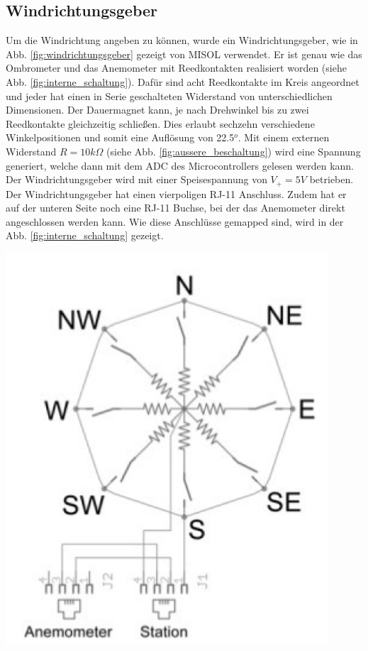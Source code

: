 \subsection{Windrichtungsgeber}
{\begin{minipage}[b][10cm][t]{0.55\textwidth}
Um die Windrichtung angeben zu können, wurde ein Windrichtungsgeber, wie in Abb. \ref{fig:windrichtungsgeber} gezeigt von MISOL verwendet. Er ist genau wie das Ombrometer und das Anemometer mit Reedkontakten realisiert worden (siehe Abb. \ref{fig:interne_schaltung}). Dafür sind acht Reedkontakte im Kreis angeordnet und jeder hat einen in Serie geschalteten Widerstand von unterschiedlichen Dimensionen. Der Dauermagnet kann, je nach Drehwinkel bis zu zwei Reedkontakte gleichzeitig schließen. Dies erlaubt sechzehn verschiedene Winkelpositionen und somit eine Auflösung von 22.5$^{o}$. Mit einem externen Widerstand $R=10k\Omega$ (siehe Abb. \ref{fig:aussere_beschaltung}) wird eine Spannung generiert, welche dann mit dem ADC des Microcontrollers gelesen werden kann. Der Windrichtungsgeber wird mit einer Speisespannung von $V_{+}=5V$ betrieben. Der Windrichtungsgeber hat einen vierpoligen RJ-11 Anschluss. Zudem hat er auf der unteren Seite noch eine RJ-11 Buchse, bei der das Anemometer direkt angeschlossen werden kann. Wie diese Anschlüsse gemapped sind, wird in der Abb. \ref{fig:interne_schaltung} gezeigt. \\
\end{minipage}}
{\begin{minipage}[b][10cm][t]{0.44\textwidth}
\centering
\includegraphics[width=0.9\textwidth]{graphics/windrichtungsgeber/interne_schaltung.PNG}
\label{fig:interne_schaltung}
\end{minipage}}

